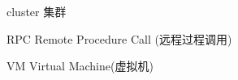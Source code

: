 \begin{denotation}[3cm]
\item[cluster] 集群
\item[RPC] Remote Procedure Call (远程过程调用)
\item[VM] Virtual Machine(虚拟机)
\end{denotation}
